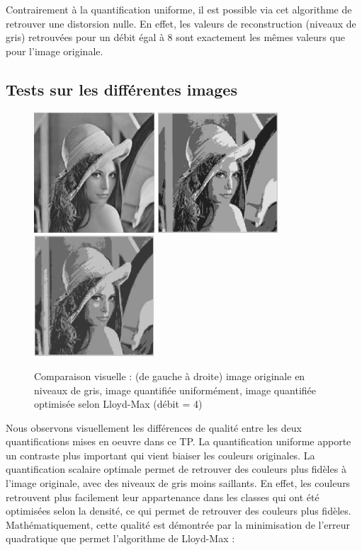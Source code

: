 \documentclass[a4paper, 12pt]{article}
\begin{document}
Contrairement à la quantification uniforme, il est possible via cet algorithme de retrouver une distorsion nulle. En effet, les valeurs de reconstruction (niveaux de gris) retrouvées pour un débit égal à 8 sont exactement les mêmes valeurs que pour l'image originale.

\subsection{Tests sur les différentes images}


\begin{figure}[H]
	\centering
		\includegraphics[width=4.5cm, height=4.5cm]{../lena_grey.jpg}
		\includegraphics[width=4.5cm, height=4.5cm]{../lena_quant_4_niveaux.jpg}
		\includegraphics[width=4.5cm, height=4.5cm]{../lena_quantlloyd_4_niveaux.jpg}
	\caption{Comparaison visuelle : (de gauche à droite) image originale en niveaux de gris, image quantifiée uniformément, image quantifiée optimisée selon Lloyd-Max (débit = 4)}
	\label{fig:comparaison_img_quant}
\end{figure}

Nous observons visuellement les différences de qualité entre les deux quantifications mises en oeuvre dans ce TP. La quantification uniforme apporte un contraste plus important qui vient biaiser les couleurs originales. La quantification scalaire optimale permet de retrouver des couleurs plus fidèles à l'image originale, avec des niveaux de gris moins saillants. En effet, les couleurs retrouvent plus facilement leur appartenance dans les classes qui ont été optimisées selon la densité, ce qui permet de retrouver des couleurs plus fidèles. Mathématiquement, cette qualité est démontrée par la minimisation de l'erreur quadratique que permet l'algorithme de Lloyd-Max :
\end{document}
